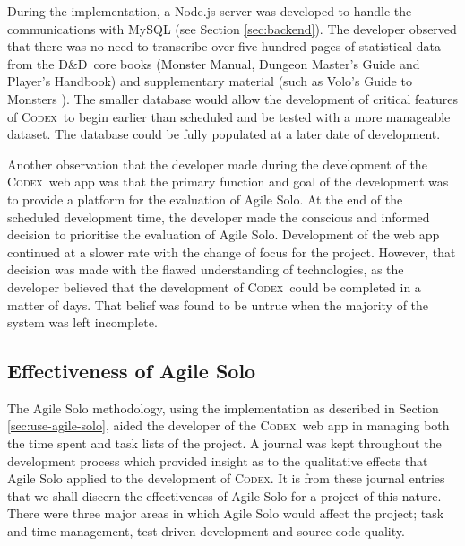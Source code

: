 \documentclass[final]{cmpreport}
\newcommand{\dnd}{D\&D}
\newcommand{\Codex}{\textsc{Codex}}
\begin{document}
		During the implementation, a Node.js server was developed to handle the communications with MySQL (see Section \ref{sec:backend}). The developer observed that there was no need to transcribe over five hundred pages of statistical data from the \dnd \ core books (Monster Manual, Dungeon Master's Guide and Player's Handbook) and supplementary material (such as Volo's Guide to Monsters \citep{Volos}). The smaller database would allow the development of critical features of \Codex \ to begin earlier than scheduled and be tested with a more manageable dataset. The database could be fully populated at a later date of development. 
		
		Another observation that the developer made during the development of the \Codex \ web app was that the primary function and goal of the development was to provide a platform for the evaluation of Agile Solo. At the end of the scheduled development time, the developer made the conscious and informed decision to prioritise the evaluation of Agile Solo. Development of the web app continued at a slower rate with the change of focus for the project. However, that decision was made with the flawed understanding of technologies, as the developer believed that the development of \Codex \ could be completed in a matter of days. That belief was found to be untrue when the majority of the system was left incomplete.
					
		\subsection{Effectiveness of Agile Solo} \label{sec:agile-solo-effect}
		The Agile Solo methodology, using the implementation as described in Section \ref{sec:use-agile-solo}, aided the developer of the \Codex \ web app in managing both the time spent and task lists of the project. A journal was kept throughout the development process which provided insight as to the qualitative effects that Agile Solo applied to the development of \Codex. It is from these journal entries that we shall discern the effectiveness of Agile Solo for a project of this nature. There were three major areas in which Agile Solo would affect the project; task and time management, test driven development and source code quality.  
		
\end{document}

